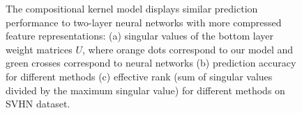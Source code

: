 \documentclass[sn-mathphys-num]{sn-jnl}%
\numberwithin{equation}{section}
\theoremstyle{thmstyleone}%
\theoremstyle{thmstyletwo}%
\theoremstyle{thmstylethree}%
\begin{document}
\begin{figure}[!htb]
\begin{minipage}[t]{0.6\textwidth}
    \end{minipage}
    \vspace{.1em} 
    \caption{The compositional kernel model displays similar prediction performance to two-layer neural networks with more compressed feature representations: (a) singular values of the bottom layer weight matrices $U$, where orange dots correspond to our model and green crosses correspond to neural networks (b) prediction accuracy for different methods (c) effective rank (sum of singular values divided by the maximum singular value) for different methods on SVHN dataset.}
    \label{fig:svhn_results}
\end{figure}







\end{document}
